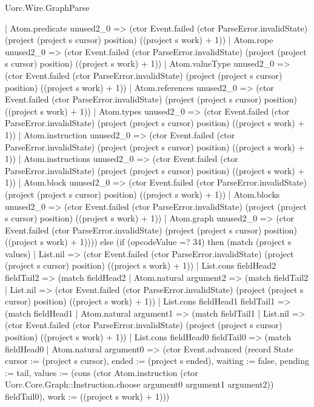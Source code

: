 \begin{lexlean}{Uorc.Wire.GraphParse}
\begin{semanticmodule}
{          | Atom.predicate unused2_0 => (ctor Event.failed (ctor ParseError.invalidState) (project (project s cursor) position) ((project s work) + 1))
          | Atom.rope unused2_0 => (ctor Event.failed (ctor ParseError.invalidState) (project (project s cursor) position) ((project s work) + 1))
          | Atom.valueType unused2_0 => (ctor Event.failed (ctor ParseError.invalidState) (project (project s cursor) position) ((project s work) + 1))
          | Atom.references unused2_0 => (ctor Event.failed (ctor ParseError.invalidState) (project (project s cursor) position) ((project s work) + 1))
          | Atom.types unused2_0 => (ctor Event.failed (ctor ParseError.invalidState) (project (project s cursor) position) ((project s work) + 1))
          | Atom.instruction unused2_0 => (ctor Event.failed (ctor ParseError.invalidState) (project (project s cursor) position) ((project s work) + 1))
          | Atom.instructions unused2_0 => (ctor Event.failed (ctor ParseError.invalidState) (project (project s cursor) position) ((project s work) + 1))
          | Atom.block unused2_0 => (ctor Event.failed (ctor ParseError.invalidState) (project (project s cursor) position) ((project s work) + 1))
          | Atom.blocks unused2_0 => (ctor Event.failed (ctor ParseError.invalidState) (project (project s cursor) position) ((project s work) + 1))
          | Atom.graph unused2_0 => (ctor Event.failed (ctor ParseError.invalidState) (project (project s cursor) position) ((project s work) + 1)))) else (if (opcodeValue =? 34) then (match (project s values)
        | List.nil => (ctor Event.failed (ctor ParseError.invalidState) (project (project s cursor) position) ((project s work) + 1))
        | List.cons fieldHead2 fieldTail2 => (match fieldHead2
          | Atom.natural argument2 => (match fieldTail2
            | List.nil => (ctor Event.failed (ctor ParseError.invalidState) (project (project s cursor) position) ((project s work) + 1))
            | List.cons fieldHead1 fieldTail1 => (match fieldHead1
              | Atom.natural argument1 => (match fieldTail1
                | List.nil => (ctor Event.failed (ctor ParseError.invalidState) (project (project s cursor) position) ((project s work) + 1))
                | List.cons fieldHead0 fieldTail0 => (match fieldHead0
                  | Atom.natural argument0 => (ctor Event.advanced (record State {cursor := (project s cursor), ended := (project s ended), waiting := false, pending := tail, values := (cons (ctor Atom.instruction (ctor Uorc.Core.Graph::Instruction.choose argument0 argument1 argument2)) fieldTail0), work := ((project s work) + 1)}))
}
\end{semanticmodule}
\end{lexlean}
